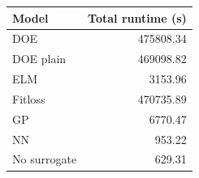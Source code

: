 \begin{tabular}{lr}
\toprule
Model & Total runtime (s) \\
\midrule
DOE & 475808.34 \\
DOE plain & 469098.82 \\
ELM & 3153.96 \\
Fitloss & 470735.89 \\
GP & 6770.47 \\
NN & 953.22 \\
No surrogate & 629.31 \\
\bottomrule
\end{tabular}
